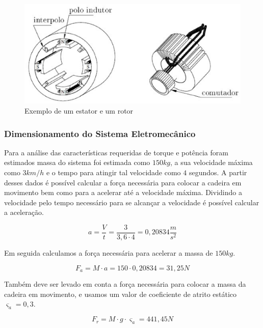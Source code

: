 \begin{figure}[H]
  \centering
    \includegraphics[width=\textwidth]{figuras/rotor.eps}
  \caption{Exemplo de um estator e um rotor \cite{bim}}
  \label{fig:rotor}
\end{figure}

\subsubsection{Dimensionamento do Sistema Eletromecânico}

Para a análise das características requeridas de torque e potência foram estimados
massa do 
sistema foi estimada como $150 kg$, a sua velocidade máxima 
como $3 km/h$
e o tempo para atingir tal velocidade como $4$ segundos. 
A partir desses dados é
possível 
calcular a força necessária para colocar a cadeira em movimento 
bem como
para a acelerar até a velocidade máxima. Dividindo a velocidade pelo tempo necessário
para se alcançar a velocidade é possível calcular a aceleração.

\begin{equation}
a = \frac{V}{t} = \frac{3}{3,6\cdot 4} = 0,20834  \frac{m}{s^2}
\end{equation}

Em seguida calculamos a força necessária para acelerar a massa de $150 kg$.

\begin{equation}
F_{a} = M \cdot a = 150 \cdot 0,20834 = 31,25 N
\end{equation}

Também deve ser levado em conta a força necessária para colocar 
a massa da cadeira
em movimento, 
e usamos um valor de coeficiente de atrito estático $\varsigma_{a} = 0,3$.

\begin{equation}
F_{r} = M \cdot g \cdot \varsigma_{a} = 441,45 N
\end{equation}

